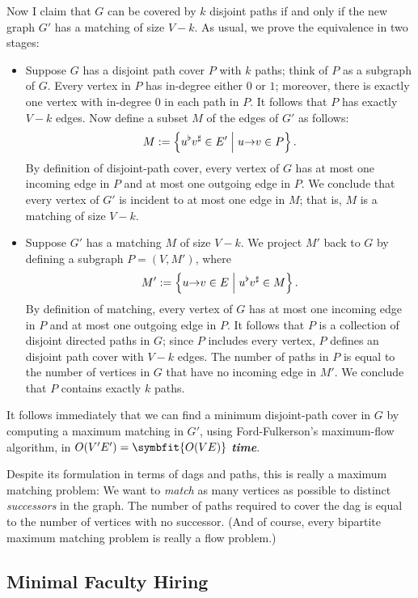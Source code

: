 Now I claim that $G$ can be covered by $k$ disjoint paths if and only if the new graph $G'$ has a matching of size $V - k$.
As usual, we prove the equivalence in two stages:
\begin{itemize}
\item[$\Leftarrow$] Suppose $G$ has a disjoint path cover $P$ with $k$ paths; think of $P$ as a subgraph of $G$.
Every vertex in $P$ has in-degree either $0$ or $1$; moreover, there is exactly one vertex with in-degree $0$ in each path in $P$.
It follows that $P$ has exactly $V - k$ edges.
Now define a subset $M$ of the edges of $G'$ as follows:
\[
M := \left\{ u^\flat v^\sharp \in E' \;\middle|\; u\mathord{\rightarrow}v \in P \right\}.
\]
By definition of disjoint-path cover, every vertex of $G$ has at most one incoming edge in $P$ and at most one outgoing edge in $P$.
We conclude that every vertex of $G'$ is incident to at most one edge in $M$; that is, $M$ is a matching of size $V - k$.
\item[$\Rightarrow$] Suppose $G'$ has a matching $M$ of size $V - k$.
We project $M'$ back to $G$ by defining a subgraph $P = (V, M')$, where
\[
M' := \left\{ u\mathord{\rightarrow}v \in E \;\middle|\; u^\flat v^\sharp \in M \right\}.
\]
By definition of matching, every vertex of $G$ has at most one incoming edge in $P$ and at most one outgoing edge in $P$.
It follows that $P$ is a collection of disjoint directed paths in $G$; since $P$ includes every vertex, $P$ defines an disjoint path cover with $V - k$ edges.
The number of paths in $P$ is equal to the number of vertices in $G$ that have no incoming edge in $M'$.
We conclude that $P$ contains exactly $k$ paths.
\end{itemize}
\noindent It follows immediately that we can find a minimum disjoint-path cover in $G$ by computing a maximum matching in $G'$, using Ford-Fulkerson’s maximum-flow algorithm, in $O(V'E') = \symbfit{O(VE)}$ \textbf{\textit{time}}.

Despite its formulation in terms of dags and paths, this is really a maximum matching problem: We want to \textit{match} as many vertices as possible to distinct \textit{successors} in the graph.
The number of paths required to cover the dag is equal to the number of vertices with no successor.
(And of course, every bipartite maximum matching problem is really a flow problem.)

\subsection{Minimal Faculty Hiring}

